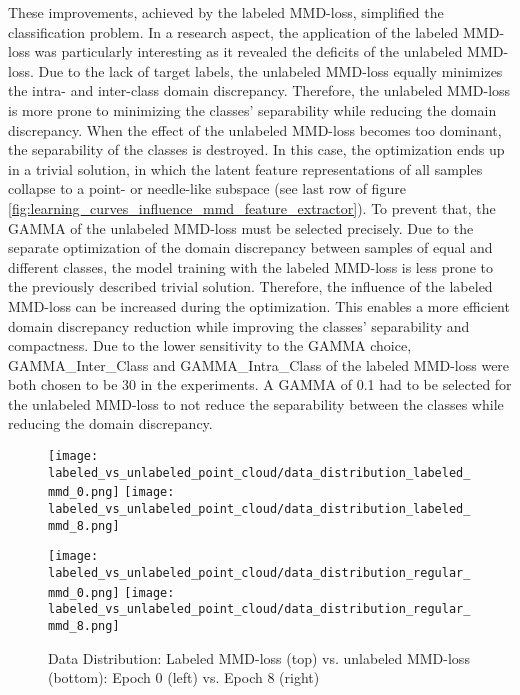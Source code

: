 These improvements, achieved by the labeled MMD-loss, simplified the classification problem. In a  research aspect, the application of the labeled MMD-loss was particularly interesting as it revealed the deficits of the unlabeled MMD-loss. Due to the lack of target labels, the unlabeled MMD-loss equally minimizes the intra- and inter-class domain discrepancy. Therefore, the unlabeled MMD-loss is more prone to minimizing the classes' separability while reducing the domain discrepancy. When the effect of the unlabeled MMD-loss becomes too dominant, the separability of the classes is destroyed. In this case, the optimization ends up in a trivial solution, in which the latent feature representations of all samples collapse to a point- or needle-like subspace (see last row of figure \ref{fig:learning_curves_influence_mmd_feature_extractor}). To prevent that, the GAMMA of the unlabeled MMD-loss must be selected precisely. Due to the separate optimization of the domain discrepancy between samples of equal and different classes, the model training with the labeled MMD-loss is less prone to the previously described trivial solution. Therefore, the influence of the labeled MMD-loss can be increased during the optimization. This enables a more efficient domain discrepancy reduction while improving the classes' separability and compactness. Due to the lower sensitivity to the GAMMA choice, GAMMA\_Inter\_Class and GAMMA\_Intra\_Class of the labeled MMD-loss were both chosen to be 30 in the experiments. A GAMMA of 0.1 had to be selected for the unlabeled MMD-loss to not reduce the separability between the classes while reducing the domain discrepancy.


\begin{figure}[htp]
  \centering
  \texttt{[image: labeled\_vs\_unlabeled\_point\_cloud/data\_distribution\_labeled\_mmd\_0.png]}
  \hspace{.4cm}
  \texttt{[image: labeled\_vs\_unlabeled\_point\_cloud/data\_distribution\_labeled\_mmd\_8.png]}

  \vspace{.1cm}

  \texttt{[image: labeled\_vs\_unlabeled\_point\_cloud/data\_distribution\_regular\_mmd\_0.png]}
  \hspace{.4cm}
  \texttt{[image: labeled\_vs\_unlabeled\_point\_cloud/data\_distribution\_regular\_mmd\_8.png]}
  
  \caption{Data Distribution: Labeled MMD-loss (top) vs. unlabeled MMD-loss (bottom): Epoch 0 (left) vs. Epoch 8 (right)}
  \label{fig:point_cloud_labeled_unlabeled_mmd}
\end{figure}

